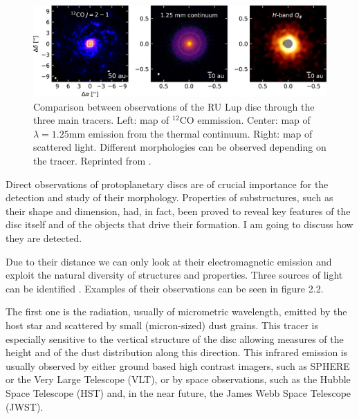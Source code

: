 \documentclass[a4paper,10pt]{report}
\begin{document}

\begin{figure}
    \begin{center}
        \includegraphics[width=\textwidth]{images/2.2.tracers.comparison/apjaba1e1f9_hr.jpg}
    \end{center}
    \caption{Comparison between observations of the RU Lup disc through the three main tracers.
    Left: map of $^{12}$CO emmission. Center: map of $\lambda=1.25$mm emission from the thermal continuum.
    Right: map of scattered light. Different morphologies can be observed depending on the tracer.
    Reprinted from \cite{img_2.2}.}
\end{figure}


Direct observations of protoplanetary discs are of crucial importance for the detection and study of their morphology.
Properties of substructures, such as their shape and dimension, had, in fact, 
been proved to reveal key features of the disc itself and
of the objects that drive their formation. I am going to discuss how they are detected.

Due to their distance we can only look at their electromagnetic emission
and exploit the natural diversity of structures and properties. 
Three sources of light can be identified \cite{disc_rev}. Examples of their
observations can be seen in figure 2.2.

The first one is the radiation, usually of micrometric wavelength, emitted by the host star and scattered by small (micron-sized) 
dust grains.
This tracer is especially sensitive to the vertical structure 
of the disc allowing measures of the height and of the dust distribution along this direction.
This infrared emission is usually observed by either ground based high contrast imagers, such as SPHERE or the Very Large Telescope (VLT), 
or by space observations, such as the Hubble Space Telescope (HST) and, in the near future, the James Webb Space Telescope (JWST).
\end{document}
